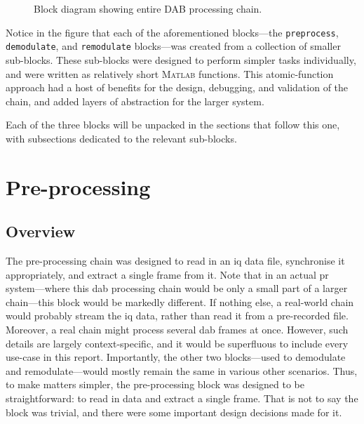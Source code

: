 \documentclass[class=report,11pt,crop=false]{standalone}
\begin{document}
\begin{figure}[htbp]
  \centering
  \captionsetup{type=figure}
  \def\svgwidth{\linewidth}
  { %
      }
  \caption{Block diagram showing entire DAB processing chain.}
  \label{fig:BD_Overview_All}
\end{figure}

Notice in the figure that each of the aforementioned blocks---the \texttt{preprocess}, \texttt{demodulate}, and \texttt{remodulate} blocks---was created from a collection of smaller sub-blocks. These sub-blocks were designed to perform simpler tasks individually, and were written as relatively short \textsc{Matlab} functions. This atomic-function approach had a host of benefits for the design, debugging, and validation of the chain, and added layers of abstraction for the larger system.

Each of the three blocks will be unpacked in the sections that follow this one, with subsections dedicated to the relevant sub-blocks.

\section{Pre-processing \label{sect:dab-proc_preprocessing}}
\subsection{Overview}
The pre-processing chain was designed to read in an \gls{iq} data file, synchronise it appropriately, and extract a single frame from it. Note that in an actual \gls{pr} system---where this \gls{dab} processing chain would be only a small part of a larger chain---this block would be markedly different. If nothing else, a real-world chain would probably stream the \gls{iq} data, rather than read it from a pre-recorded file. Moreover, a real chain might process several \gls{dab} frames at once. However, such details are largely context-specific, and it would be superfluous to include every use-case in this report. Importantly, the other two blocks---used to demodulate and remodulate---would mostly remain the same in various other scenarios. Thus, to make matters simpler, the pre-processing block was designed to be straightforward: to read in data and extract a single frame. That is not to say the block was trivial, and there were some important design decisions made for it.
\end{document}

